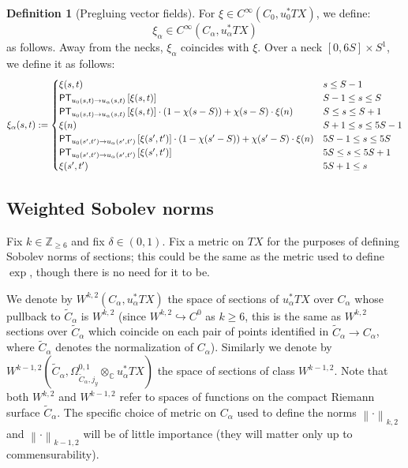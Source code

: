 \documentclass[12pt]{article}
\theoremstyle{definition}
\newtheorem{definition}[theorem]{Definition}
\theoremstyle{remark}
\numberwithin{equation}{subsection}
\newcommand{\CC}{\mathbb C}
\newcommand{\ZZ}{\mathbb Z}
\newcommand{\PT}{\mathsf{PT}}
\begin{document}
\begin{definition}[Pregluing vector fields]
For $\xi\in C^\infty(C_0,u_0^\ast TX)$, we define:
\begin{equation}
\xi_\alpha\in C^\infty(C_\alpha,u_\alpha^\ast TX)
\end{equation}
as follows.  Away from the necks, $\xi_\alpha$ coincides with $\xi$.  Over a neck $[0,6S]\times S^1$, we define it as follows:
\begin{equation}\label{kernelpregluingformula}
\xi_\alpha(s,t):=\begin{cases}
\xi(s,t)&s\leq S-1\cr
\PT_{u_0(s,t)\to u_\alpha(s,t)}\left[\xi(s,t)\right]&S-1\leq s\leq S\cr
\PT_{u_0(s,t)\to u_\alpha(s,t)}\left[\xi(s,t)\right]\cdot(1-\chi(s-S))+\chi(s-S)\cdot \xi(n)&S\leq s\leq S+1\cr
\xi(n)&S+1\leq s\leq 5S-1\cr
\PT_{u_0(s',t')\to u_\alpha(s',t')}\left[\xi(s',t')\right]\cdot(1-\chi(s'-S))+\chi(s'-S)\cdot \xi(n)&5S-1\leq s\leq 5S\cr
\PT_{u_0(s',t')\to u_\alpha(s',t')}\left[\xi(s',t')\right]&5S\leq s\leq 5S+1\cr
\xi(s',t')&5S+1\leq s
\end{cases}
\end{equation}
\end{definition}

\subsection{Weighted Sobolev norms}

Fix $k\in\ZZ_{\geq 6}$ and fix $\delta\in(0,1)$.  Fix a metric on $TX$ for the purposes of defining Sobolev norms of sections; this could be the same as the metric used to define $\exp$, though there is no need for it to be.

We denote by $W^{k,2}(C_\alpha,u_\alpha^\ast TX)$ the space of sections of $u_\alpha^\ast TX$ over $C_\alpha$ whose pullback to $\tilde C_\alpha$ is $W^{k,2}$ (since $W^{k,2}\hookrightarrow C^0$ as $k\geq 6$, this is the same as $W^{k,2}$ sections over $\tilde C_\alpha$ which coincide on each pair of points identified in $\tilde C_\alpha\to C_\alpha$, where $\tilde C_\alpha$ denotes the normalization of $C_\alpha$).  Similarly we denote by $W^{k-1,2}(\tilde C_\alpha,\Omega^{0,1}_{\tilde C_\alpha,j_y}\otimes_\CC u_\alpha^\ast TX)$ the space of sections of class $W^{k-1,2}$.  Note that both $W^{k,2}$ and $W^{k-1,2}$ refer to spaces of functions on the compact Riemann surface $\tilde C_\alpha$.  The specific choice of metric on $C_\alpha$ used to define the norms $\left\|\cdot\right\|_{k,2}$ and $\left\|\cdot\right\|_{k-1,2}$ will be of little importance (they will matter only up to commensurability).
\end{document}
